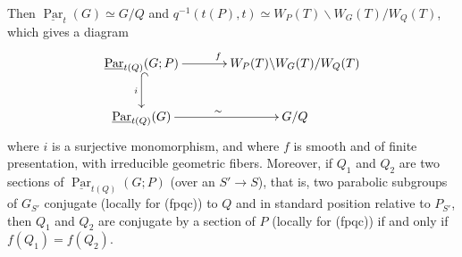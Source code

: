 Then $\underline{\operatorname{Par}}_t(G)\simeq G/Q$ and $q^{-1}(t(P),t)\simeq W_P(T)\backslash W_G(T)/W_Q(T)$, which gives a diagram
\[
\xymatrix@C=35pt@R=25pt{
\underline{\operatorname{Par}}_{t(Q)}(G;P)\ar[r]^f\ar@{^{(}->}[d]_i&W_P(T)\backslash W_G(T)/W_Q(T)\\
\underline{\operatorname{Par}}_{t(Q)}(G)\ar[r]^\sim&G/Q
}
\]
where $i$ is a surjective monomorphism, and where $f$ is smooth and of finite presentation, with irreducible geometric fibers. Moreover, if $Q_1$ and $Q_2$ are two sections of $\underline{\operatorname{Par}}_{t(Q)}(G;P)$ (over an $S'\to S$), that is, two parabolic subgroups of $G_{S'}$ conjugate (locally for (fpqc)) to $Q$ and in standard position relative to $P_{S'}$, then $Q_1$ and $Q_2$ are conjugate by a section of $P$ (locally for (fpqc)) if and only if $f(Q_1)=f(Q_2)$.
